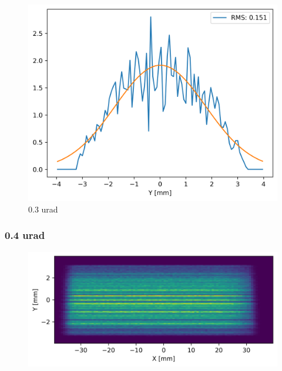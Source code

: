 \begin{figure}[H]
\centering
\includegraphics[width=0.9\linewidth]{./../figures/slope_error/WB4C_d30_d-spacing_gradient_45keV_slope_error03urad_ESRFID19PW150_Yprofile.png}
\caption{0.3 urad}
\label{fig:03urad}
\end{figure}

\clearpage
\subsubsection{0.4 urad}
\begin{figure}[H]
\centering
\includegraphics[width=0.9\linewidth]{./../figures/slope_error/WB4C_d30_d-spacing_gradient_45keV_slope_error04urad.png}
\end{figure}

